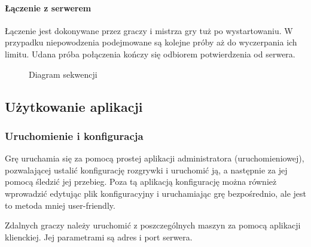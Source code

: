 \documentclass[11pt]{article}
\let\Oldsubsection\subsection
\renewcommand{\subsection}{\FloatBarrier\Oldsubsection}
\let\Oldsubsubsection\subsubsection
\renewcommand{\subsubsection}{\FloatBarrier\Oldsubsubsection}
\begin{document}
\paragraph{Łączenie z serwerem}

Łączenie jest dokonywane przez graczy i mistrza gry tuż po wystartowaniu. W przypadku niepowodzenia podejmowane są kolejne próby aż do wyczerpania ich limitu. Udana próba połączenia kończy się odbiorem potwierdzenia od serwera.

\begin{figure}[!h]
	\centering
	\caption{Diagram sekwencji}
\end{figure}

\subsection{Użytkowanie aplikacji}

\subsubsection{Uruchomienie i konfiguracja}
\par
Grę uruchamia się za pomocą prostej aplikacji administratora (uruchomieniowej), pozwalającej ustalić konfigurację rozgrywki i uruchomić ją, a następnie za jej pomocą śledzić jej przebieg. Poza tą aplikacją konfigurację można również wprowadzić edytując plik konfiguracyjny i uruchamiając grę bezpośrednio, ale jest to metoda mniej user-friendly.
\par
Zdalnych graczy należy uruchomić z poszczególnych maszyn za pomocą aplikacji klienckiej. Jej parametrami są adres i port serwera.
\end{document}

